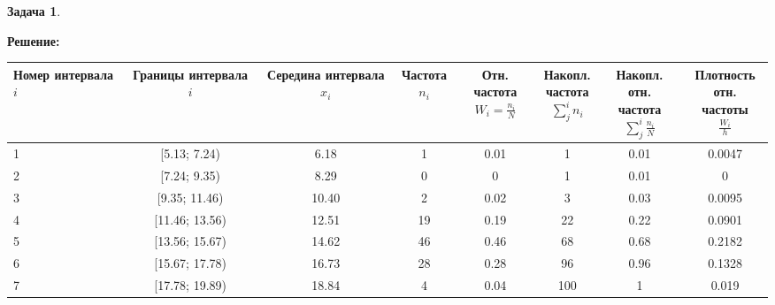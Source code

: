 \documentclass[a4paper,12pt]{article}
\theoremstyle{definition}
\newtheorem{problem}{Задача}\setlength{\parindent}{0pt}
\newenvironment{solution}
{\begin{shaded}\textbf{Решение:}\par\setlength{\parindent}{0pt}}
{\end{shaded}}
\begin{document}
\begin{problem}
    \begin{solution}
        \begin{table}[H]
            \centering
            \begin{adjustbox}{max width=\textwidth}
                \begin{tabular}{l c c c c c c c}
                    \toprule
                        \makecell{Номер\\интервала \( i \)} & 
                        \makecell{Границы \\ интервала \( i \)} & 
                        \makecell{Середина\\интервала \( x_i \)} & 
                        \makecell{Частота\\\( n_i \)} & 
                        \makecell{Отн. частота\\\( W_i = \frac{n_i}{N} \)} & 
                        \makecell{Накопл.\\частота\\\( \sum^i_j n_i \)} & 
                        \makecell{Накопл. отн.\\частота\\\( \sum^i_j \frac{n_i}{N} \)} & 
                        \makecell{Плотность\\отн. частоты\\\( \frac{W_i}{h} \)} \\
                            \midrule
                                1 & [5.13; 7.24) & 6.18 & 1 & 0.01 & 1 & 0.01 & 0.0047 \\
                                2 & [7.24; 9.35) & 8.29 & 0 & 0 & 1 & 0.01 & 0 \\
                                3 & [9.35; 11.46) & 10.40 & 2 & 0.02 & 3 & 0.03 & 0.0095 \\
                                4 & [11.46; 13.56) & 12.51 & 19 & 0.19 & 22 & 0.22 & 0.0901 \\
                                5 & [13.56; 15.67) & 14.62 & 46 & 0.46 & 68 & 0.68 & 0.2182 \\
                                6 & [15.67; 17.78) & 16.73 & 28 & 0.28 & 96 & 0.96 & 0.1328 \\
                                7 & [17.78; 19.89) & 18.84 & 4 & 0.04 & 100 & 1 & 0.019 \\
                            \bottomrule
                \end{tabular}
            \end{adjustbox}
        \end{table}  
    \end{solution}
    \end{problem}
\end{document}
